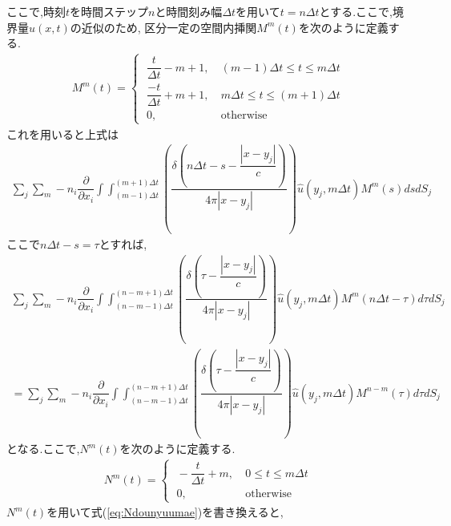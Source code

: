 \documentclass[dvipdfmx]{ampbt}
\begin{document}
ここで,時刻$t$を時間ステップ$n$と時間刻み幅$\Delta t$を用いて$t=n\Delta t$とする.ここで,境界量$\hat{u}(x,t)$の近似のため,
区分一定の空間内挿関$M^m(t)$を次のように定義する.
\begin{align}
  M^m(t) =
\begin{cases}
\; \dfrac{t}{\Delta t}-m+1,&\ (m-1)\Delta t \leq t \leq m\Delta t  \\
\; \dfrac{-t}{\Delta t}+m+1,&\ m\Delta t \leq t \leq (m+1)\Delta t  \\
\; 0, &\ \mbox{otherwise}
\end{cases}
\end{align}
これを用いると上式は
\begin{align}
\sum_j \sum_m -n_i\dfrac{\partial}{\partial x_i}\int\!\!\!\int_{(m-1)\Delta t }^{(m+1)\Delta t} \left( \dfrac{\delta(n\Delta t-s-\dfrac{|x-y_j|}{c})}{4\pi|x-y_j|} \right) \hat{u}(y_j,m\Delta t)M^m(s)dsdS_j
\end{align}
ここで$n\Delta t-s = \tau$とすれば,
\begin{align}
\sum_j \sum_m -n_i\dfrac{\partial}{\partial x_i}\int\!\!\!\int_{(n-m-1)\Delta t }^{(n-m+1)\Delta t} \left( \dfrac{\delta(\tau- \dfrac{|x-y_j|}{c})}{4\pi|x-y_j|} \right) \hat{u}(y_j,m\Delta t)M^m(n\Delta t - \tau)d\tau dS_j \nonumber \\
\label{eq:Ndounyuumae}
= \sum_j \sum_m -n_i\dfrac{\partial}{\partial x_i}\int\!\!\!\int_{(n-m-1)\Delta t }^{(n-m+1)\Delta t} \left( \dfrac{\delta(\tau- \dfrac{|x-y_j|}{c})}{4\pi|x-y_j|} \right) \hat{u}(y_j,m\Delta t)M^{n-m}(\tau)d\tau dS_j
\end{align}
となる.ここで,$N^m(t)$を次のように定義する.
\begin{align}
  N^m(t) =
\begin{cases}
\; -\dfrac{t}{\Delta t}+m,&\ 0 \leq t \leq m\Delta t  \\
\; 0, &\ \mbox{otherwise}
\end{cases}
\end{align}
$N^m(t)$を用いて式(\ref{eq:Ndounyuumae})を書き換えると,
\end{document}
